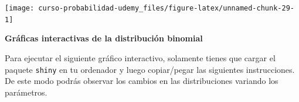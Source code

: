 \documentclass[]{book}
\newenvironment{Shaded}{\begin{snugshade}}{\end{snugshade}}
\newcommand{\DataTypeTok}[1]{\textcolor[rgb]{0.13,0.29,0.53}{#1}}
\newcommand{\DecValTok}[1]{\textcolor[rgb]{0.00,0.00,0.81}{#1}}
\newcommand{\FloatTok}[1]{\textcolor[rgb]{0.00,0.00,0.81}{#1}}
\newcommand{\KeywordTok}[1]{\textcolor[rgb]{0.13,0.29,0.53}{\textbf{#1}}}
\newcommand{\NormalTok}[1]{#1}
\newcommand{\OperatorTok}[1]{\textcolor[rgb]{0.81,0.36,0.00}{\textbf{#1}}}
\newcommand{\StringTok}[1]{\textcolor[rgb]{0.31,0.60,0.02}{#1}}
\begin{document}
\begin{center}\texttt{[image: curso-probabilidad-udemy\_files/figure-latex/unnamed-chunk-29-1]} \end{center}

\textbf{Gráficas interactivas de la distribución binomial}

Para ejecutar el siguiente gráfico interactivo, solamente tienes que cargar el paquete \texttt{shiny} en tu ordenador y luego copiar/pegar las siguientes instrucciones. De este modo podrás observar los cambios en las distribuciones variando los parámetros.

\begin{Shaded}
\end{Shaded}
\end{document}

